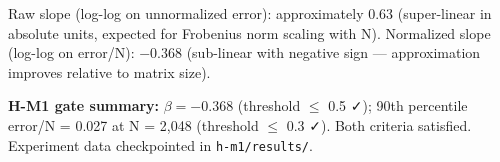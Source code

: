 
\begin{table}[htbp]
\centering
{}
\end{table}

Raw slope (log-log on unnormalized error): approximately 0.63 (super-linear in absolute units, expected for Frobenius norm scaling with N). Normalized slope (log-log on error/N): $-0.368$ (sub-linear with negative sign --- approximation improves relative to matrix size).

\textbf{H-M1 gate summary:} $\beta = -0.368$ (threshold $\leq$ 0.5 ✓); 90th percentile error/N = 0.027 at N = 2,048 (threshold $\leq$ 0.3 ✓). Both criteria satisfied. Experiment data checkpointed in \texttt{h-m1/results/}.
